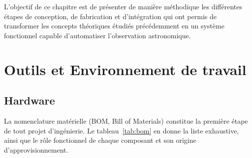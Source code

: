 \documentclass[12pt,a4paper]{report}
\begin{document}
L’objectif de ce chapitre est de présenter de manière méthodique les différentes étapes de conception, de fabrication et d’intégration qui ont permis de transformer les concepts théoriques étudiés précédemment en un système fonctionnel capable d’automatiser l’observation astronomique.

\section{Outils et Environnement de travail}
\subsection{Hardware}
La nomenclature matérielle (BOM, Bill of Materials) constitue la première étape de tout projet d'ingénierie. Le tableau~\ref{tab:bom} en donne la liste exhaustive, ainsi que le rôle fonctionnel de chaque composant et son origine d'approvisionnement.
\end{document}
